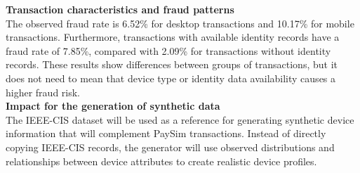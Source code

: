 \documentclass[titlepage]{article}
\begin{document}
\noindent \textbf{Transaction characteristics and fraud patterns}\\
The observed fraud rate is 6.52\% for desktop transactions and 10.17\% for mobile transactions. Furthermore, transactions with available identity records have a fraud rate of 7.85\%, compared with 2.09\% for transactions without identity records. These results show differences between groups of transactions, but it does not need to mean that device type or identity data availability causes a higher fraud risk.\\

\noindent \textbf{Impact for the generation of synthetic data}\\
The IEEE-CIS dataset will be used as a reference for generating synthetic device information that will complement PaySim transactions. Instead of directly copying IEEE-CIS records, the generator will use observed distributions and relationships between device attributes to create realistic device profiles.
\end{document}
